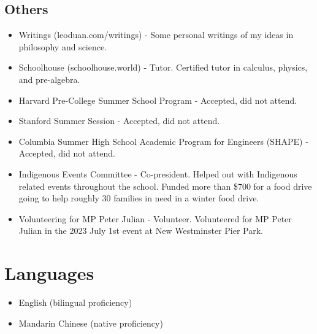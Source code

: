 \documentclass{article}
\begin{document}
\subsection*{Others}
\begin{itemize}
    \item Writings (leoduan.com/writings) - Some personal writings of my ideas in philosophy and science.
    \item Schoolhouse (schoolhouse.world) - Tutor. Certified tutor in calculus, physics, and pre-algebra.
    \item Harvard Pre-College Summer School Program - Accepted, did not attend.
    \item Stanford Summer Session - Accepted, did not attend.
    \item Columbia Summer High School Academic Program for Engineers (SHAPE) - Accepted, did not attend.
    \item Indigenous Events Committee - Co-president. Helped out with Indigenous related events throughout the school. Funded more than \$700 for a food drive going to help roughly 30 families in need in a winter food drive.
    \item Volunteering for MP Peter Julian - Volunteer. Volunteered for MP Peter Julian in the 2023 July 1st event at New Westminster Pier Park.
\end{itemize}

\section*{Languages}

\begin{itemize}
    \item English (bilingual proficiency)
    \item Mandarin Chinese (native proficiency)
\end{itemize}
\end{document}
